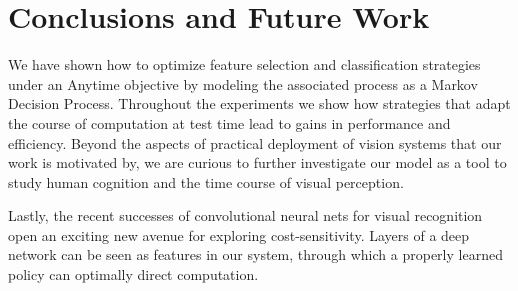 \section{Conclusions and Future Work}
We have shown how to optimize feature selection and classification strategies under an Anytime objective by modeling the associated process as a Markov Decision Process.
Throughout the experiments we show how strategies that adapt the course of computation at test time lead to gains in performance and efficiency.
Beyond the aspects of practical deployment of vision systems that our work is motivated by, we are curious to further investigate our model as a tool to study human cognition and the time course of visual perception.

Lastly, the recent successes of convolutional neural nets for visual recognition open an exciting new avenue for exploring cost-sensitivity.
Layers of a deep network can be seen as features in our system, through which a properly learned policy can optimally direct computation.
